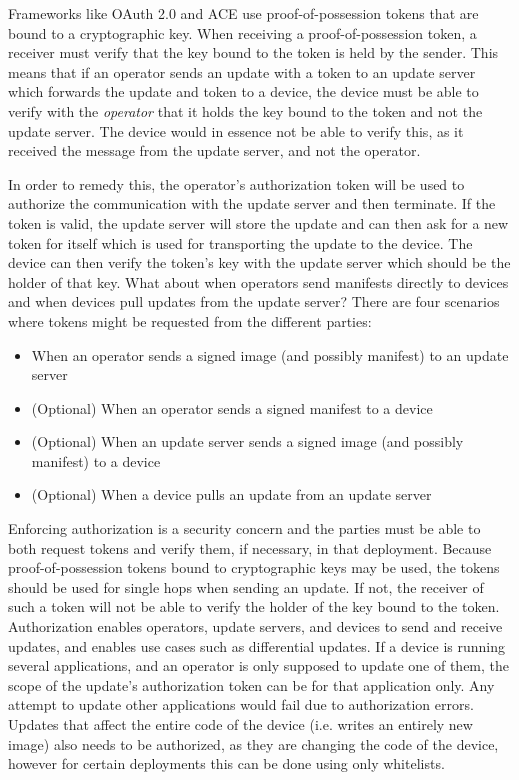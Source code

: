 \documentclass[0-thesis.tex]{subfiles}
\begin{document}
Frameworks like OAuth 2.0 and ACE use proof-of-possession tokens that are bound to a
cryptographic key. When receiving a proof-of-possession token, a receiver must verify that
the key bound to the token is held by the sender. This means that if an operator sends an
update with a token to an update server which forwards the update and token to a device,
the device must be able to verify with the \textit{operator} that it holds the key bound
to the token and not the update server. The device would in essence not be able to verify
this, as it received the message from the update server, and not the operator.

In order to remedy this, the operator's authorization token will be used to authorize the
communication with the update server and then terminate. If the token is valid, the update
server will store the update and can then ask for a new token for itself which is used for
transporting the update to the device. The device can then verify the token's key with the
update server which should be the holder of that key. What about when operators send
manifests directly to devices and when devices pull updates from the update server? There
are four scenarios where tokens might be requested from the different parties:

\begin{itemize}
    \item When an operator sends a signed image (and possibly manifest) to an update
            server
    \item (Optional) When an operator sends a signed manifest to a device
    \item (Optional) When an update server sends a signed image (and possibly manifest) to a device
    \item (Optional) When a device pulls an update from an update server
\end{itemize}

Enforcing authorization is a security concern and the parties must be able to both request
tokens and verify them, if necessary, in that deployment. Because proof-of-possession
tokens bound to cryptographic keys may be used, the tokens should be used for single hops
when sending an update. If not, the receiver of such a token will not be able to verify
the holder of the key bound to the token. Authorization enables operators, update servers,
and devices to send and receive updates, and enables use cases such as differential
updates. If a device is running several applications, and an operator is only supposed to
update one of them, the scope of the update's authorization token can be for that
application only. Any attempt to update other applications would fail due to authorization
errors. Updates that affect the entire code of the device (i.e. writes an entirely new
image) also needs to be authorized, as they are changing the code of the device, however
for certain deployments this can be done using only whitelists.
\end{document}
